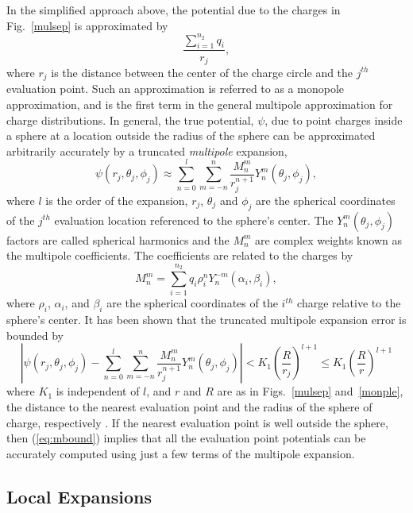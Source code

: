 In the simplified approach above, the potential due to the charges in
Fig.~\ref{mulsep} is approximated by
\begin{equation}
\frac{\sum_{i=1}^{n_2} q_i}{r_j},
\end{equation}
where $ r_j $ is the distance between the center of the charge circle
and the $j^{th}$ evaluation point.
Such an approximation is referred to as
a monopole approximation, and is the first term in the general 
multipole approximation for charge distributions.
In general, the true potential, $\psi$, due to 
point charges inside a sphere
at a location outside the radius of the sphere  can be approximated
arbitrarily accurately
by a truncated
{\em multipole} expansion,
\begin{equation}
\psi(r_j, \theta_j , \phi_j ) \approx \sum_{n=0}^{l} \sum_{m=-n}^{n}
\frac{M^m_n}{r_j^{n+1}} Y^m_n(\theta_j , \phi_j ),
\label{eq:multi}
\end{equation}
where $ l $ is the order of the expansion, $ r_j $, $\theta_j $ and $ \phi_j$ 
are the spherical coordinates of the $j^{th}$ evaluation location referenced
to the sphere's center. The $ Y^m_n(\theta_j , \phi_j ) $ factors
are called spherical harmonics \cite{gre,jac} and the $ M^m_n$ 
are complex weights
known as the multipole coefficients. 
The coefficients are related to
the charges
by
\begin{equation}
M^m_n = \sum_{i=1}^{n_2} q_i \rho^n_i Y^{-m}_n(\alpha_i, \beta_i),
\label{eq:mulmom}
\end{equation}
where $ \rho_i $, $ \alpha_i $, and $ \beta_i $ are the spherical
coordinates of the $ i^{th} $ charge relative to the sphere's center.
It has been shown that the truncated multipole expansion error is bounded by
\begin{equation}
| \psi(r_j, \theta_j , \phi_j ) - \sum_{n=0}^{l} \sum_{m=-n}^{n}
\frac{M^m_n}{r_j^{n+1}} Y^m_n(\theta_j , \phi_j )| < K_1 
\left( \frac{R}{r_j} \right)^{l+1} \leq K_1 \left( \frac{R}{r} \right)^{l+1}
\label{eq:mbound}
\end{equation}
where
$ K_1 $ is independent of $l$, and
$r$ and
$ R $ are as in Figs.~\ref{mulsep} and~\ref{monple}, 
the distance to the nearest
evaluation point and the
radius of the sphere of charge, respectively \cite{gre}.  If the nearest
evaluation point is well outside the sphere, then  (\ref{eq:mbound}) 
implies that all the evaluation point potentials can be accurately computed
using just a few terms of the multipole expansion.

\subsection{Local Expansions}

